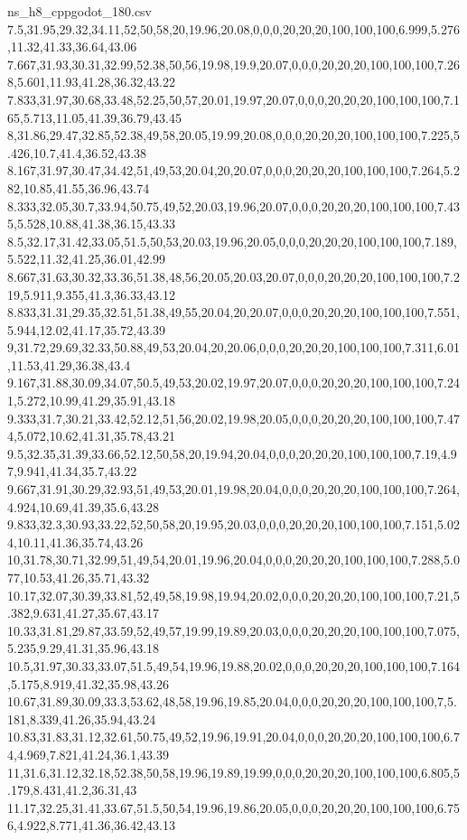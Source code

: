 \begin{filecontents*}[overwrite]{ns_h8_cppgodot_180.csv}
7.5,31.95,29.32,34.11,52,50,58,20,19.96,20.08,0,0,0,20,20,20,100,100,100,6.999,5.276,11.32,41.33,36.64,43.06
7.667,31.93,30.31,32.99,52.38,50,56,19.98,19.9,20.07,0,0,0,20,20,20,100,100,100,7.268,5.601,11.93,41.28,36.32,43.22
7.833,31.97,30.68,33.48,52.25,50,57,20.01,19.97,20.07,0,0,0,20,20,20,100,100,100,7.165,5.713,11.05,41.39,36.79,43.45
8,31.86,29.47,32.85,52.38,49,58,20.05,19.99,20.08,0,0,0,20,20,20,100,100,100,7.225,5.426,10.7,41.4,36.52,43.38
8.167,31.97,30.47,34.42,51,49,53,20.04,20,20.07,0,0,0,20,20,20,100,100,100,7.264,5.282,10.85,41.55,36.96,43.74
8.333,32.05,30.7,33.94,50.75,49,52,20.03,19.96,20.07,0,0,0,20,20,20,100,100,100,7.435,5.528,10.88,41.38,36.15,43.33
8.5,32.17,31.42,33.05,51.5,50,53,20.03,19.96,20.05,0,0,0,20,20,20,100,100,100,7.189,5.522,11.32,41.25,36.01,42.99
8.667,31.63,30.32,33.36,51.38,48,56,20.05,20.03,20.07,0,0,0,20,20,20,100,100,100,7.219,5.911,9.355,41.3,36.33,43.12
8.833,31.31,29.35,32.51,51.38,49,55,20.04,20,20.07,0,0,0,20,20,20,100,100,100,7.551,5.944,12.02,41.17,35.72,43.39
9,31.72,29.69,32.33,50.88,49,53,20.04,20,20.06,0,0,0,20,20,20,100,100,100,7.311,6.01,11.53,41.29,36.38,43.4
9.167,31.88,30.09,34.07,50.5,49,53,20.02,19.97,20.07,0,0,0,20,20,20,100,100,100,7.241,5.272,10.99,41.29,35.91,43.18
9.333,31.7,30.21,33.42,52.12,51,56,20.02,19.98,20.05,0,0,0,20,20,20,100,100,100,7.474,5.072,10.62,41.31,35.78,43.21
9.5,32.35,31.39,33.66,52.12,50,58,20,19.94,20.04,0,0,0,20,20,20,100,100,100,7.19,4.97,9.941,41.34,35.7,43.22
9.667,31.91,30.29,32.93,51,49,53,20.01,19.98,20.04,0,0,0,20,20,20,100,100,100,7.264,4.924,10.69,41.39,35.6,43.28
9.833,32.3,30.93,33.22,52,50,58,20,19.95,20.03,0,0,0,20,20,20,100,100,100,7.151,5.024,10.11,41.36,35.74,43.26
10,31.78,30.71,32.99,51,49,54,20.01,19.96,20.04,0,0,0,20,20,20,100,100,100,7.288,5.077,10.53,41.26,35.71,43.32
10.17,32.07,30.39,33.81,52,49,58,19.98,19.94,20.02,0,0,0,20,20,20,100,100,100,7.21,5.382,9.631,41.27,35.67,43.17
10.33,31.81,29.87,33.59,52,49,57,19.99,19.89,20.03,0,0,0,20,20,20,100,100,100,7.075,5.235,9.29,41.31,35.96,43.18
10.5,31.97,30.33,33.07,51.5,49,54,19.96,19.88,20.02,0,0,0,20,20,20,100,100,100,7.164,5.175,8.919,41.32,35.98,43.26
10.67,31.89,30.09,33.3,53.62,48,58,19.96,19.85,20.04,0,0,0,20,20,20,100,100,100,7,5.181,8.339,41.26,35.94,43.24
10.83,31.83,31.12,32.61,50.75,49,52,19.96,19.91,20.04,0,0,0,20,20,20,100,100,100,6.74,4.969,7.821,41.24,36.1,43.39
11,31.6,31.12,32.18,52.38,50,58,19.96,19.89,19.99,0,0,0,20,20,20,100,100,100,6.805,5.179,8.431,41.2,36.31,43
11.17,32.25,31.41,33.67,51.5,50,54,19.96,19.86,20.05,0,0,0,20,20,20,100,100,100,6.756,4.922,8.771,41.36,36.42,43.13

\end{filecontents*}
